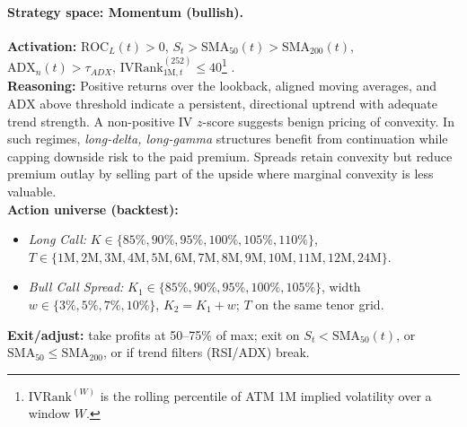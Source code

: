 \documentclass[12pt,a4paper]{report}
\begin{document}
\paragraph{Strategy space: Momentum (bullish).}
\textbf{Activation:} $\mathrm{ROC}_{L}(t)>0$, $S_t>\mathrm{SMA}_{50}(t)>\mathrm{SMA}_{200}(t)$, $\mathrm{ADX}_{n}(t)>\tau_{ADX}$, $\text{IVRank}^{(252)}_{1\mathrm{M},t} \le 40$\footnote{%
$\text{IVRank}^{(W)}$ is the rolling percentile of ATM 1M implied volatility over a window $W$.}
. \\[2pt]
\textbf{Reasoning:} Positive returns over the lookback, aligned moving averages, and $\mathrm{ADX}$ above threshold indicate a persistent, directional uptrend with adequate trend strength. A non-positive IV $z$-score suggests benign pricing of convexity. In such regimes, \emph{long-delta, long-gamma} structures benefit from continuation while capping downside risk to the paid premium. Spreads retain convexity but reduce premium outlay by selling part of the upside where marginal convexity is less valuable. \\[2pt]
\textbf{Action universe (backtest):}
\begin{itemize}
    \item \emph{Long Call:} $K \in \{85\%,90\%,95\%,100\%,105\%,110\%\}$,\quad
    $T \in \{1\text{M},2\text{M},3\text{M},4\text{M},5\text{M},6\text{M},7\text{M},8\text{M},9\text{M},10\text{M},11\text{M},12\text{M},24\text{M}\}$.
    \item \emph{Bull Call Spread:} $K_1 \in \{85\%,90\%,95\%,100\%,105\%\}$,\; width $w \in \{3\%,5\%,7\%,10\%\}$,\; $K_2=K_1+w$;\;
    $T$ on the same tenor grid.
\end{itemize}
\textbf{Exit/adjust:} take profits at 50--75\% of max; exit on $S_t < \mathrm{SMA}_{50}(t)$, or $\mathrm{SMA}_{50}\le\mathrm{SMA}_{200}$, or if trend filters (RSI/ADX) break.
\end{document}

